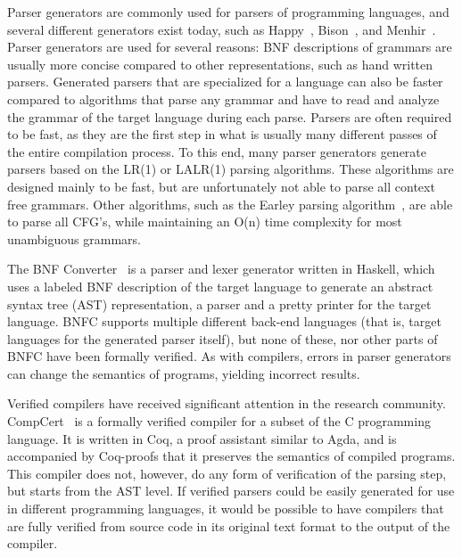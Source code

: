 \documentclass{article}
\begin{document}
	Parser generators are commonly used for parsers of programming languages,
	and several different generators exist today, such as Happy~\cite{Happy},
	Bison~\cite{Bison}, and Menhir~\cite{Menhir}. Parser generators are used
	for several reasons: BNF descriptions of grammars are usually more concise
	compared to other representations, such as hand written parsers. Generated
	parsers that are specialized for a language can also be faster compared to
	algorithms that parse any grammar and have to read and analyze the grammar
	of the target language during each parse. Parsers are often required to be
	fast, as they are the first step in what is usually many different passes
	of the entire compilation process. To this end, many parser generators
	generate parsers based on the LR(1) or LALR(1) parsing algorithms. These
	algorithms are designed mainly to be fast, but are unfortunately not able
	to parse all context free grammars.  Other algorithms, such as the Earley
	parsing algorithm~\cite{Earley}, are able to parse all CFG's, while
	maintaining an O(n) time complexity for most unambiguous grammars.

	The BNF Converter~\cite{BNFC} is a parser and lexer generator written in
	Haskell, which uses a labeled BNF description of the target language to
	generate an abstract syntax tree (AST) representation, a parser and a pretty
	printer for the target language. BNFC supports multiple different back-end
	languages (that is, target languages for the generated parser itself), but
	none of these, nor other parts of BNFC have been formally verified. As with
	compilers, errors in parser generators can change the semantics of
	programs, yielding incorrect results.



	Verified compilers have received significant attention in the research
	community. CompCert~\cite{Leroy} is a formally verified compiler for a
	subset of the C programming language. It is written in Coq, a proof assistant similar to
	Agda, and is accompanied by Coq-proofs that it preserves
	the semantics of compiled programs.
	This compiler does not, however, do any form of verification of the
	parsing step, but starts from the AST level. If verified parsers could be
	easily generated for use in different programming languages, it would be
	possible to have compilers that are fully verified from source code in its
	original text format to the output of the compiler.
\end{document}
